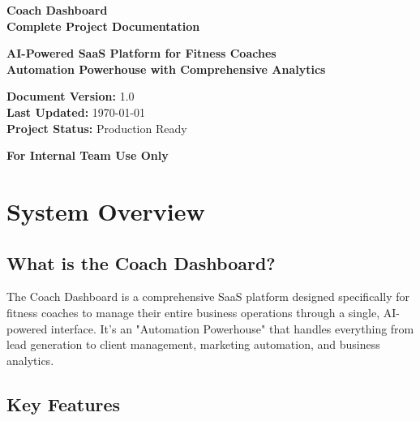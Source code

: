 \documentclass[12pt,a4paper]{article}
\begin{document}
\begin{titlepage}
    \centering
    \vspace*{2cm}
    
    {\Huge\bfseries\color{blue} Coach Dashboard}\\[0.5cm]
    {\Large\bfseries Complete Project Documentation}\\[1cm]
    
    \vspace{1cm}
    
    {\large\textbf{AI-Powered SaaS Platform for Fitness Coaches}}\\[0.5cm]
    {\large\textbf{Automation Powerhouse with Comprehensive Analytics}}\\[1cm]
    
    \vspace{2cm}
    
    {\large\textbf{Document Version:} 1.0}\\[0.5cm]
    {\large\textbf{Last Updated:} \today}\\[0.5cm]
    {\large\textbf{Project Status:} Production Ready}\\[1cm]
    
    \vfill
    
    {\large\textbf{For Internal Team Use Only}}
\end{titlepage}

\tableofcontents
\newpage

\section{System Overview}

\subsection{What is the Coach Dashboard?}

The Coach Dashboard is a comprehensive SaaS platform designed specifically for fitness coaches to manage their entire business operations through a single, AI-powered interface. It's an "Automation Powerhouse" that handles everything from lead generation to client management, marketing automation, and business analytics.

\subsection{Key Features}
\end{document}
